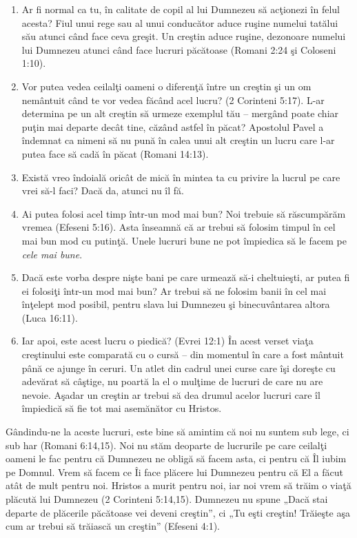 \begin{enumerate}
	\item Ar fi normal ca tu, în calitate de copil al lui Dumnezeu să acţionezi în felul acesta? Fiul unui rege sau al unui conducător aduce ruşine numelui tatălui său atunci când face ceva greşit. Un creştin aduce ruşine, dezonoare numelui lui Dumnezeu atunci când face lucruri păcătoase (Romani 2:24 şi Coloseni 1:10).
	
	\item Vor putea vedea ceilalţi oameni o diferenţă între un creştin şi un om nemântuit când te vor vedea făcând acel lucru? (2 Corinteni 5:17). L-ar determina pe un alt creştin să urmeze exemplul tău – mergând poate chiar puţin mai departe decât tine, căzând astfel în păcat? Apostolul Pavel a îndemnat ca nimeni să nu pună în calea unui alt creştin un lucru care l-ar putea face să cadă în păcat (Romani 14:13).
	
	\item Există vreo îndoială oricât de mică în mintea ta cu privire la lucrul pe care vrei să-l faci? Dacă da, atunci nu îl fă.
	
	\item Ai putea folosi acel timp într-un mod mai bun? Noi trebuie să răscumpărăm vremea (Efeseni 5:16). Asta înseamnă că ar trebui să folosim timpul în cel mai bun mod cu putinţă. Unele lucruri bune ne pot împiedica să le facem pe \textit{cele mai bune}.
	
	\item Dacă este vorba despre nişte bani pe care urmează să-i cheltuieşti, ar putea fi ei folosiţi într-un mod mai bun? Ar trebui să ne folosim banii în cel mai înţelept mod posibil, pentru slava lui Dumnezeu şi binecuvântarea altora (Luca 16:11).
	
	\item Iar apoi, este acest lucru o piedică? (Evrei 12:1) În acest verset viaţa creştinului este comparată cu o cursă – din momentul în care a fost mântuit până ce ajunge în ceruri. Un atlet din cadrul unei curse care îşi doreşte cu adevărat să câştige, nu poartă la el o mulţime de lucruri de care nu are nevoie. Aşadar un creştin ar trebui să dea drumul acelor lucruri care îl împiedică să fie tot mai asemănător cu Hristos.
	
\end{enumerate}

Gândindu-ne la aceste lucruri, este bine să amintim că noi nu suntem sub lege, ci sub har (Romani 6:14,15). Noi nu stăm deoparte de lucrurile pe care ceilalţi oameni le fac pentru că Dumnezeu ne obligă să facem asta, ci pentru că Îl iubim pe Domnul. Vrem să facem ce Îi face plăcere lui Dumnezeu pentru că El a făcut atât de mult pentru noi. Hristos a murit pentru noi, iar noi vrem să trăim o viaţă plăcută lui Dumnezeu (2 Corinteni 5:14,15). Dumnezeu nu spune „Dacă stai departe de plăcerile păcătoase vei deveni creştin”, ci „Tu eşti creştin! Trăieşte aşa cum ar trebui să trăiască un creştin” (Efeseni 4:1).